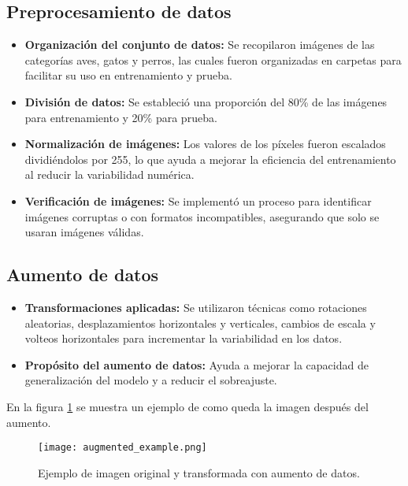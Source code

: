 \documentclass[conference]{IEEEtran}
\begin{document}
\subsection{Preprocesamiento de datos}

\begin{itemize}
    \item \textbf{Organización del conjunto de datos:} Se recopilaron imágenes de las categorías aves, gatos y perros, las cuales fueron organizadas en carpetas para facilitar su uso en entrenamiento y prueba.

    \item \textbf{División de datos:} Se estableció una proporción del 80\% de las imágenes para entrenamiento y 20\% para prueba.

    \item \textbf{Normalización de imágenes:} Los valores de los píxeles fueron escalados dividiéndolos por 255, lo que ayuda a mejorar la eficiencia del entrenamiento al reducir la variabilidad numérica.

    \item \textbf{Verificación de imágenes:} Se implementó un proceso para identificar imágenes corruptas o con formatos incompatibles, asegurando que solo se usaran imágenes válidas.
\end{itemize}



\subsection{Aumento de datos}

\begin{itemize}
    \item \textbf{Transformaciones aplicadas:} Se utilizaron técnicas como rotaciones aleatorias, desplazamientos horizontales y verticales, cambios de escala y volteos horizontales para incrementar la variabilidad en los datos.

    \item \textbf{Propósito del aumento de datos:} Ayuda a mejorar la capacidad de generalización del modelo y a reducir el sobreajuste.
\end{itemize}

En la figura \ref{fig:data_augmentation} se muestra un ejemplo de como queda la imagen después del aumento.

\FloatBarrier

\begin{figure}[h]
    \centering
    \texttt{[image: augmented\_example.png]}
    \caption{Ejemplo de imagen original y transformada con aumento de datos.}
    \label{fig:data_augmentation}
\end{figure}
\end{document}
